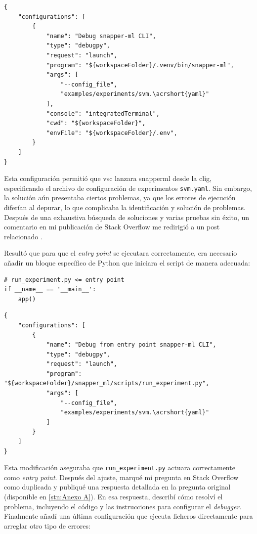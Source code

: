 \begin{verbatim}
{
    "configurations": [
        {
            "name": "Debug snapper-ml CLI",
            "type": "debugpy",
            "request": "launch",
            "program": "${workspaceFolder}/.venv/bin/snapper-ml", 
            "args": [
                "--config_file",
                "examples/experiments/svm.\acrshort{yaml}"
            ],
            "console": "integratedTerminal",
            "cwd": "${workspaceFolder}",
            "envFile": "${workspaceFolder}/.env",
        }
    ]
}
\end{verbatim}

Esta configuración permitió que \acrshort{vsc} lanzara \Gls{snapperml} desde la \Gls{clig}, especificando el archivo de configuración de experimentos \texttt{svm.\acrshort{yaml}}. Sin embargo, la solución aún presentaba ciertos problemas, ya que los errores de ejecución diferían al depurar, lo que complicaba la identificación y solución de problemas. Después de una exhaustiva búsqueda de soluciones y varias pruebas sin éxito, un comentario en mi publicación de Stack Overflow me redirigió a un post relacionado \cite{stackoverflow_first_solution}.

Resultó que para que el \textit{entry point} se ejecutara correctamente, era necesario añadir un bloque específico de Python que iniciara el script de manera adecuada:

\begin{verbatim}
# run_experiment.py <= entry point
if __name__ == '__main__':
    app() 
\end{verbatim}
\begin{verbatim}
{
    "configurations": [
        {
            "name": "Debug from entry point snapper-ml CLI",
            "type": "debugpy",
            "request": "launch",
            "program": "${workspaceFolder}/snapper_ml/scripts/run_experiment.py",
            "args": [
                "--config_file",
                "examples/experiments/svm.\acrshort{yaml}"
            ]
        }
    ]
}
\end{verbatim}

Esta modificación aseguraba que \texttt{run\_experiment.py} actuara correctamente como \textit{entry point}. Después del ajuste, marqué mi pregunta en Stack Overflow como duplicada y publiqué una respuesta detallada en la pregunta original \cite{stackoverflow_first_solution} (disponible en \ref{stn:Anexo A}). En esa respuesta, describí cómo resolví el problema, incluyendo el código y las instrucciones para configurar el \textit{debugger}. Finalmente añadí una última configuración que ejecuta ficheros directamente para arreglar otro tipo de errores:

